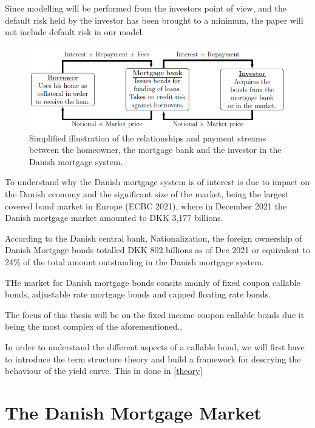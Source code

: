 \documentclass[12pt,twoside]{reedthesis}
\begin{document}
Since modelling will be performed from the investors point of view, and the default risk held by the investor has been brought to a minimum, the paper will not include default risk in our model.
\begin{figure}

{\centering \includegraphics[width=1\linewidth]{figure/bond_cash_flow_illustration_23012022} 

}

\caption{Simplified illustration of the relationships and payment streams between the homeowner, the mortgage bank and the investor in the Danish mortgage system.}\label{fig:bondCashFlow}
\end{figure}
To understand why the Danish mortgage system is of interest is due to impact on
the Danish economy and the significant size of the market, being the largest covered
bond market in Europe (ECBC 2021), where in December 2021 the Danish mortgage market amounted to DKK 3,177 billions.

According to the Danish central bank, Nationalization, the foreign ownership of Danish Mortgage bonds totalled DKK 802 billions as of Dec 2021 or equivalent to 24\% of the total amount outstanding in the Danish mortgage system.

THe market for Danish mortgage bonds consits mainly of fixed coupon callable bonds, adjustable rate mortgage bonds and capped floating rate bonds.

The focus of this thesis will be on the fixed income coupon callable bonds due it being the most complex of the aforementioned.,

In order to understand the different aspects of a callable bond, we will first have to introduce the term structure theory and build a framework for descrying the behaviour of the yield curve. This in done in \ref{theory}

\hypertarget{the-danish-mortgage-market}{%
\chapter{The Danish Mortgage Market}\label{the-danish-mortgage-market}}
\end{document}
